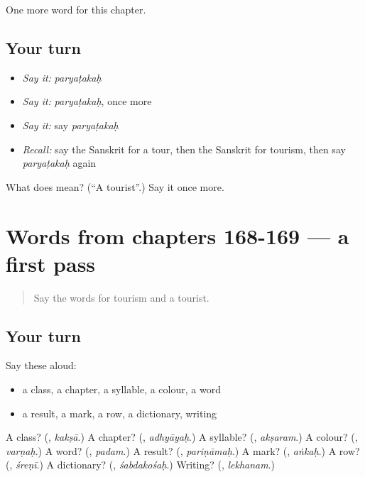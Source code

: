 \begin{grammarlens}[title={What you've built}]
One more word for this chapter.
\end{grammarlens}

\subsection*{Your turn}
\begin{itemize}
\raggedright
  \item \emph{Say it:} \emph{paryaṭakaḥ}
  \item \emph{Say it:} \emph{paryaṭakaḥ}, once more
  \item \emph{Say it:} say \emph{paryaṭakaḥ}
  \item \emph{Recall:} say the Sanskrit for a tour, then the Sanskrit for tourism, then say \emph{paryaṭakaḥ} again
\end{itemize}

\begin{tcolorbox}[breakable,colback=teal!4,colframe=teal!35!black,title={Before you move on}]
What does  mean? (\textquotedblleft{}A tourist\textquotedblright{}.) Say it once more.
\end{tcolorbox}
\section[(dialogue)]{Words from chapters 168-169 — a first pass}

\label{lesson:SA-R172-first-pass-words-from-chapters-168-169}



\begin{quote}
Say the words for tourism and a tourist.
\end{quote}

\subsection*{Your turn}
Say these aloud:

\begin{itemize}
\raggedright
  \item a class, a chapter, a syllable, a colour, a word
  \item a result, a mark, a row, a dictionary, writing
\end{itemize}

\begin{tcolorbox}[breakable,colback=teal!4,colframe=teal!35!black,title={Before you move on}]
A class? (\textbf{}, \emph{kakṣā}.) A chapter? (\textbf{}, \emph{adhyāyaḥ}.) A syllable? (\textbf{}, \emph{akṣaram}.) A colour? (\textbf{}, \emph{varṇaḥ}.) A word? (\textbf{}, \emph{padam}.) A result? (\textbf{}, \emph{pariṇāmaḥ}.) A mark? (\textbf{}, \emph{aṅkaḥ}.) A row? (\textbf{}, \emph{śreṇī}.) A dictionary? (\textbf{}, \emph{śabdakośaḥ}.) Writing? (\textbf{}, \emph{lekhanam}.)
\end{tcolorbox}
